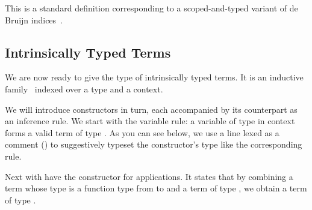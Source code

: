 \documentclass{article}
\begin{document}
\noindent
\begin{minipage}{.5\textwidth}
\end{minipage}\hfill
\begin{minipage}{.45\textwidth}
\end{minipage}

This is a standard definition
corresponding to a scoped-and-typed variant of de Bruijn
indices~\cite{de1972lambda}.

\subsection{Intrinsically Typed Terms}

We are now ready to give the type of intrinsically typed terms.
It is an inductive family~\cite{DBLP:journals/fac/Dybjer94}
indexed over a type and a context.


We will introduce constructors in turn, each accompanied by its
counterpart as an inference rule.
%
We start with the variable rule: a variable of type  in
context forms a valid term of type .
%
As you can see below, we use a line lexed as a comment (\AC{---})
to suggestively typeset the constructor's type like the
corresponding rule.

\noindent
\begin{minipage}[t]{.5\textwidth}
\end{minipage}\hfill
\begin{minipage}[t]{.35\textwidth}
\begin{mathpar}
\end{mathpar}
\end{minipage}

Next with have the constructor for applications. It states that
by combining a term whose type is a function type from  to 
and a term of type , we obtain a term of type .

\noindent
\begin{minipage}[t]{.5\textwidth}
\end{minipage}\hfill
\begin{minipage}[t]{.35\textwidth}
\begin{mathpar}
\end{mathpar}
\end{minipage}
\end{document}
